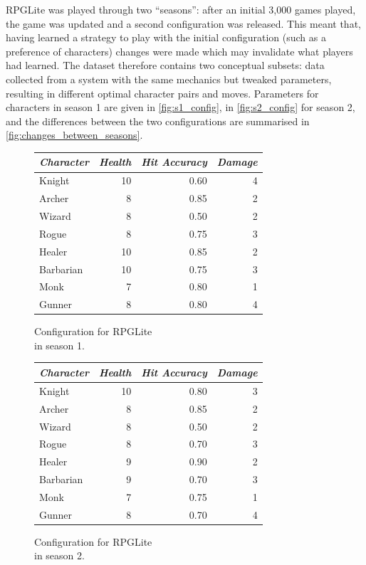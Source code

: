 RPGLite was played through two ``seasons'': after an initial 3,000 games
played, the game was updated and a second configuration was released. This meant
that, having learned a strategy to play with the initial configuration (such as
a preference of characters) changes were made which may invalidate what players
had learned. The dataset therefore contains two conceptual subsets: data
collected from a system with the same mechanics but tweaked parameters,
resulting in different optimal character pairs and moves. Parameters for
characters in season 1 are given in \cref{fig:s1_config}, in
\cref{fig:s2_config} for season 2, and the differences between the two
configurations are summarised in \cref{fig:changes_between_seasons}.

\begin{figure}[h]
  \begin{minipage}{.50\columnwidth}
    \centering
    \begin{tabular}{@{}l r r r@{}}
      \toprule
      \emph{Character} & \emph{Health} & \emph{Hit Accuracy} & \emph{Damage}\\
      \midrule
      Knight & 10 & 0.60 & 4 \\
      Archer & 8 & 0.85 & 2 \\
      Wizard & 8 & 0.50 & 2 \\
      Rogue & 8 & 0.75 & 3 \\
      Healer & 10 & 0.85 & 2 \\
      Barbarian & 10 & 0.75 & 3 \\
      Monk & 7 & 0.80 & 1 \\
      Gunner & 8 & 0.80 & 4 \\
      \bottomrule
    \end{tabular}
    \caption{Configuration for RPGLite\\in season 1.}
    \label{fig:s1_config}
  \end{minipage}%
  \begin{minipage}{.50\columnwidth}
    \centering
    \begin{tabular}{@{}l r r r@{}}
      \toprule
      \emph{Character} & \emph{Health} & \emph{Hit Accuracy} & \emph{Damage}\\
      \midrule
      Knight & 10 & 0.80 & 3 \\
      Archer & 8 & 0.85 & 2 \\
      Wizard & 8 & 0.50 & 2 \\
      Rogue & 8 & 0.70 & 3 \\
      Healer & 9 & 0.90 & 2 \\
      Barbarian & 9 & 0.70 & 3 \\
      Monk & 7 & 0.75 & 1 \\
      Gunner & 8 & 0.70 & 4 \\
      \bottomrule
    \end{tabular}
    \caption{Configuration for RPGLite\\in season 2.}
    \label{fig:s2_config}
  \end{minipage}
\label{fig:table_of_char_params_between_seasons}
\end{figure}

